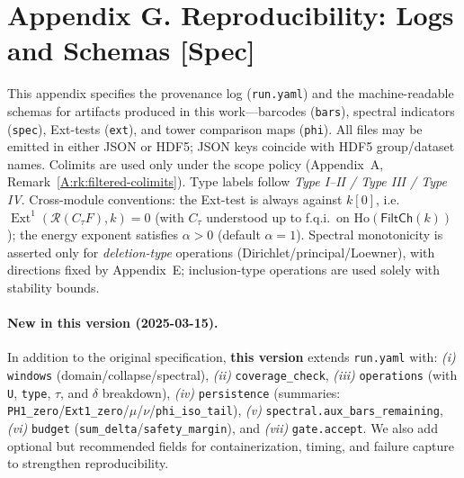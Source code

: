 \documentclass[11pt]{article}
\DeclareMathOperator{\Ext}{Ext}
\newcommand{\Ho}{\mathrm{Ho}}
\numberwithin{equation}{section}
\theoremstyle{definition}
\begin{document}
\section*{Appendix G. Reproducibility: Logs and Schemas [Spec]}
{}
\label{G:repro}

This appendix specifies the provenance log (\texttt{run.yaml}) and the machine-readable
schemas for artifacts produced in this work—barcodes (\texttt{bars}), spectral indicators
(\texttt{spec}), Ext-tests (\texttt{ext}), and tower comparison maps (\texttt{phi}).
All files may be emitted in either JSON or HDF5; JSON keys coincide with HDF5
group/dataset names. Colimits are used only under the scope policy
(Appendix~A, Remark~\ref{A:rk:filtered-colimits}). Type labels follow \emph{Type I--II / Type III / Type IV}.
Cross-module conventions: the Ext-test is always against \(k[0]\), i.e.\ \(\Ext^1(\mathcal{R}(C_\tau F),k)=0\)
(with \(C_\tau\) understood up to f.q.i.\ on \(\Ho(\mathsf{FiltCh}(k))\)); the energy exponent satisfies
\(\alpha>0\) (default \(\alpha=1\)). Spectral monotonicity is asserted only for \emph{deletion-type} operations
(Dirichlet/principal/Loewner), with directions fixed by Appendix~E; inclusion-type operations
are used solely with stability bounds.

\paragraph{New in this version (2025-03-15).}
In addition to the original specification, \textbf{this version} extends \texttt{run.yaml} with:
\emph{(i)} \texttt{windows} (domain/collapse/spectral), \emph{(ii)} \texttt{coverage\_check},
\emph{(iii)} \texttt{operations} (with \texttt{U}, \texttt{type}, \(\tau\), and \(\delta\) breakdown),
\emph{(iv)} \texttt{persistence} (summaries: \texttt{PH1\_zero}/\texttt{Ext1\_zero}/\(\mu\)/\(\nu\)/\texttt{phi\_iso\_tail}),
\emph{(v)} \texttt{spectral.aux\_bars\_remaining}, \emph{(vi)} \texttt{budget} (\texttt{sum\_delta}/\texttt{safety\_margin}),
and \emph{(vii)} \texttt{gate.accept}. We also add optional but recommended fields for containerization,
timing, and failure capture to strengthen reproducibility.
\end{document}
